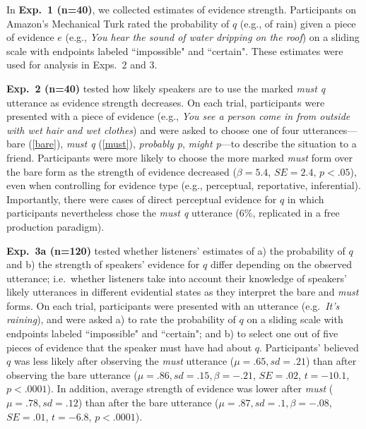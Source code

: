 \documentclass[11pt]{article}
\begin{document}
In \textbf{Exp.~1 (n=40)}, we collected estimates of evidence strength. Participants on Amazon's Mechanical Turk rated the probability of $q$ (e.g., of rain) given a piece of evidence $e$ (e.g., \emph{You hear the sound of water dripping on the roof}) on a sliding scale with endpoints labeled ``impossible" and ``certain". These estimates were used for analysis in Exps.~2 and 3.

\textbf{Exp.~2 (n=40)} tested how likely speakers are to use the marked \emph{must q} utterance as evidence strength decreases. On each trial, participants were presented with a piece of evidence (e.g., \emph{You see a person come in from outside with wet hair and wet clothes}) and were asked to choose one of four utterances---bare (\ref{bare}), \emph{must q} (\ref{must}), \emph{probably p}, \emph{might p}---to describe the situation to a friend. Participants were more likely to choose the more marked \emph{must} form over the bare form as the strength of evidence decreased ($\beta=5.4$, $SE=2.4$, $p<.05$), even when controlling for evidence type (e.g., perceptual, reportative, inferential). Importantly, there were cases of direct perceptual evidence for $q$ in which participants nevertheless chose the \emph{must q} utterance (6\%, replicated in a free production paradigm).

\textbf{Exp.~3a (n=120)} tested whether listeners' estimates of a) the probability of $q$ and b) the strength of speakers' evidence for $q$ differ depending on the observed utterance; i.e.~whether listeners take into account their knowledge of speakers' likely utterances in different evidential states as they interpret the bare and \emph{must} forms. On each trial, participants were presented with an utterance (e.g.~\emph{It's raining}), and were asked a) to rate the probability of $q$ on a sliding scale with endpoints labeled ``impossible" and ``certain"; and b) to select one out of five pieces of evidence that the speaker must have had about $q$. Participants' believed $q$ was less likely after observing the \emph{must} utterance ($\mu=.65,sd=.21$) than after observing the bare utterance ($\mu=.86,sd=.15, \beta=-.21$, $SE=.02$, $t=-10.1$, $p<.0001$). In addition, average strength of evidence was lower after \emph{must} ($\mu=.78,sd=.12$) than after the bare utterance ($\mu=.87,sd=.1, \beta=-.08$, $SE=.01$, $t=-6.8$, $p<.0001$).
\end{document}
